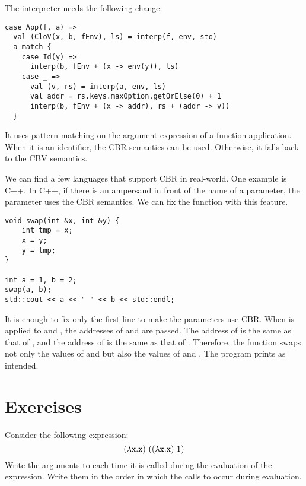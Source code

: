 The interpreter needs the following change:

\begin{verbatim}
case App(f, a) =>
  val (CloV(x, b, fEnv), ls) = interp(f, env, sto)
  a match {
    case Id(y) =>
      interp(b, fEnv + (x -> env(y)), ls)
    case _ =>
      val (v, rs) = interp(a, env, ls)
      val addr = rs.keys.maxOption.getOrElse(0) + 1
      interp(b, fEnv + (x -> addr), rs + (addr -> v))
  }
\end{verbatim}

It uses pattern matching on the argument expression of a function application.
When it is an identifier, the CBR semantics can be used. Otherwise, it falls
back to the CBV semantics.

We can find a few languages that support CBR in real-world. One example is C++.
In C++, if there is an ampersand in front of the name of a parameter,
the parameter uses the CBR semantics. We can fix the function  with
this feature.

\begin{verbatim}
void swap(int &x, int &y) {
    int tmp = x;
    x = y;
    y = tmp;
}

int a = 1, b = 2;
swap(a, b);
std::cout << a << " " << b << std::endl;
\end{verbatim}

It is enough to fix only the first line to make the parameters use CBR. When
 is applied to  and , the addresses of  and
 are passed. The address of  is the same as that of
, and the address of  is the same as that of .
Therefore, the function swaps not only the values of  and  but
also the values of  and . The program prints  as
intended.

\section{Exercises}

\begin{exercise}

Consider the following \lang expression:
\[
  (\lambda\texttt{x}.\texttt{x})\ ((\lambda\texttt{x}.\texttt{x})\ 1)
\]
Write the arguments to  each time it is called
during the evaluation of the expression. Write them in the order in
which the calls to  occur during evaluation.

\end{exercise}

